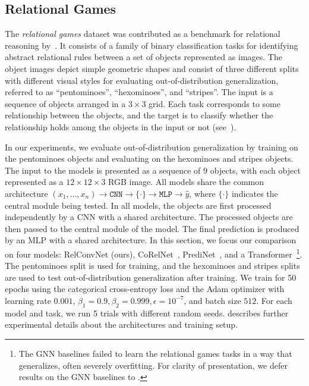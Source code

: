 \subsection{Relational Games}\label{ssec:exp_relational_games}

The \textit{relational games} dataset was contributed as a benchmark for relational reasoning by~\citet{shanahanExplicitlyRelationalNeural}. It consists of a family of binary classification tasks for identifying abstract relational rules between a set of objects represented as images. The object images depict simple geometric shapes and consist of three different splits with different visual styles for evaluating out-of-distribution generalization, referred to as ``pentominoes'', ``hexominoes'', and ``stripes''. The input is a sequence of objects arranged in a $3 \times 3$ grid. Each task corresponds to some relationship between the objects, and the target is to classify whether the relationship holds among the objects in the input or not (see~).

In our experiments, we evaluate out-of-distribution generalization by training on the pentominoes objects and evaluating on the hexominoes and stripes objects. The input to the models is presented as a sequence of $9$ objects, with each object represented as a $12 \times 12 \times 3$ RGB image. All models share the common architecture $(x_1, \ldots, x_n) \to \texttt{CNN} \to \{ \cdot \} \to \texttt{MLP} \to \hat{y}$, where $\{\cdot\}$ indicates the central module being tested. In all models, the objects are first processed independently by a CNN with a shared architecture. The processed objects are then passed to the central module of the model. The final prediction is produced by an MLP with a shared architecture. 
In this section, we focus our comparison on four models: RelConvNet (ours), CoRelNet~\citep{kergNeuralArchitecture2022}, PrediNet~\citep{shanahanExplicitlyRelationalNeural}, and a Transformer~\citep{vaswani2017attention}\footnote{The GNN baselines failed to learn the relational games tasks in a way that generalizes, often severely overfitting. For clarity of presentation, we defer results on the GNN baselines to . }.
The pentominoes split is used for training,
and the hexominoes and stripes splits are used to test out-of-distribution generalization after training. 
We train for 50 epochs using the categorical cross-entropy loss and the Adam optimizer with learning rate $0.001$, $\beta_1 = 0.9, \beta_2 = 0.999, \epsilon = 10^{-7}$, and batch size $512$. For each model and task, we run 5 trials with different random seeds.
 describes further experimental details about the architectures and training setup.

